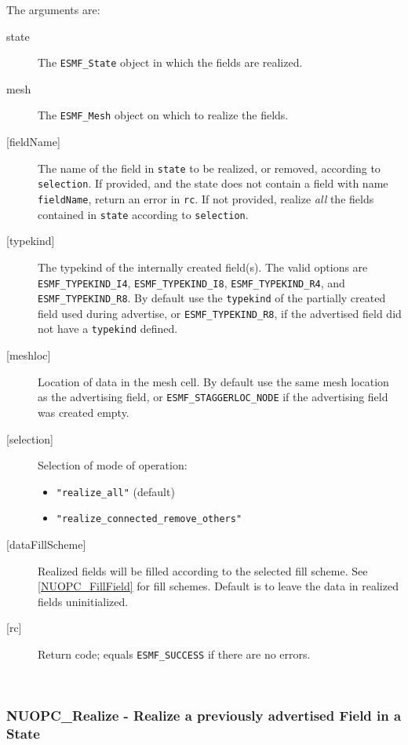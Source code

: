      The arguments are:
     \begin{description}
     \item[state]
       The {\tt ESMF\_State} object in which the fields are realized.
     \item[mesh]
       The {\tt ESMF\_Mesh} object on which to realize the fields.
     \item[{[fieldName]}]
       The name of the field in {\tt state} to be realized, or removed, according
       to {\tt selection}. If provided, and the state does not contain a field
       with name {\tt fieldName}, return an error in {\tt rc}. If not provided,
       realize {\em all} the fields contained in {\tt state} according to 
       {\tt selection}.
     \item[{[typekind]}]
       The typekind of the internally created field(s). The valid options are
       {\tt ESMF\_TYPEKIND\_I4}, {\tt ESMF\_TYPEKIND\_I8},
       {\tt ESMF\_TYPEKIND\_R4}, and {\tt ESMF\_TYPEKIND\_R8}.
       By default use the {\tt typekind} of the partially created field used
       during advertise, or {\tt ESMF\_TYPEKIND\_R8}, if the advertised field 
       did not have a {\tt typekind} defined.
     \item[{[meshloc]}]
       Location of data in the mesh cell. By default use the same
       mesh location as the advertising field, or 
       {\tt ESMF\_STAGGERLOC\_NODE} if the advertising field was created empty.
     \item[{[selection]}]
       Selection of mode of operation:
       \begin{itemize}
       \item {\tt "realize\_all"} (default)
       \item {\tt "realize\_connected\_remove\_others"}
       \end{itemize}
     \item[{[dataFillScheme]}]
       Realized fields will be filled according to the selected fill
       scheme. See \ref{NUOPC_FillField} for fill schemes. Default is to leave
       the data in realized fields uninitialized.
     \item[{[rc]}]
       Return code; equals {\tt ESMF\_SUCCESS} if there are no errors.
     \end{description}
   
 
\mbox{}\hrulefill\ 
 
\subsubsection [NUOPC\_Realize] {NUOPC\_Realize - Realize a previously advertised Field in a State}


